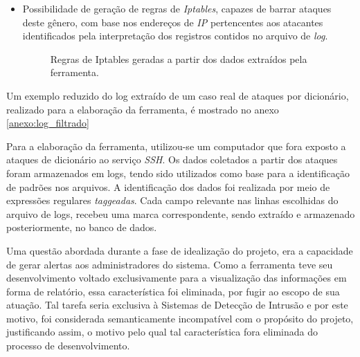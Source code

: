 \begin{itemize}
    \clearpage
    \item Possibilidade de geração de regras de \textit{Iptables}, capazes de barrar ataques deste gênero, com base nos endereços de \textit{IP} pertencentes aos atacantes identificados pela interpretação dos registros contidos no arquivo de \textit{log}.

    \begin{figure}[h!tp]
        \centering
        \caption{\label{figura:crickets_iptables} Regras de Iptables geradas a partir dos dados extraídos pela ferramenta.}
    \end{figure}

\end{itemize}

Um exemplo reduzido do log extraído de um caso real de ataques por dicionário, realizado para a elaboração da ferramenta, é mostrado no anexo \ref{anexo:log_filtrado}

Para a elaboração da ferramenta, utilizou-se um computador que fora exposto a ataques de dicionário ao serviço \textit{SSH}. Os dados coletados a partir dos ataques foram armazenados em logs, tendo sido utilizados como base para a identificação de padrões nos arquivos. A identificação dos dados foi realizada por meio de expressões regulares \textit{taggeadas}. Cada campo relevante nas linhas escolhidas do arquivo de logs, recebeu uma marca correspondente, sendo extraído e armazenado posteriormente, no banco de dados.

Uma questão abordada durante a fase de idealização do projeto, era a capacidade de gerar alertas aos administradores do sistema. Como a ferramenta teve seu desenvolvimento voltado exclusivamente para a visualização das informações em forma de relatório, essa característica foi eliminada, por fugir ao escopo de sua atuação. Tal tarefa seria exclusiva à Sistemas de Detecção de Intrusão e por este motivo, foi considerada semanticamente incompatível com o propósito do projeto, justificando assim, o motivo pelo qual tal característica fora eliminada do processo de desenvolvimento.


